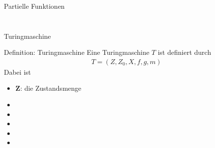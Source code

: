 \begin{frame}{Partielle Funktionen}
\begin{columns}[t]
\begin{column}{.5\textwidth}
\begin{figure}[t]
            \end{figure}
        \end{column}
    \end{columns}
\end{frame}


\begin{frame}{Turingmaschine}
    \begin{block}{Definition: Turingmaschine}
        Eine Turingmaschine $T$ ist definiert durch
        \begin{align*}
            T = \left( Z, Z_0, X, f, g, m \right)
        \end{align*}
        Dabei ist 
        \begin{itemize}
            \item $\mathbf{Z}$: die Zustandsmenge
                \pause
            \item {}
                \pause
            \item {}
                \pause
            \item {}
                \pause
            \item {}
                \pause
            \item {}
        \end{itemize}
    \end{block}
\end{frame}


